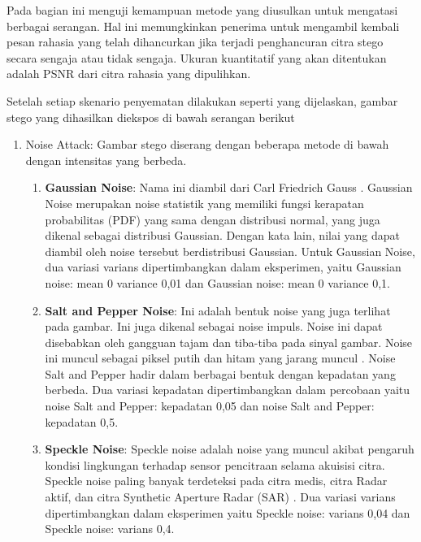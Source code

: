 \documentclass{ittelkom}
\begin{document}
Pada bagian ini menguji kemampuan metode yang diusulkan untuk mengatasi
berbagai serangan. Hal ini memungkinkan penerima untuk mengambil kembali pesan
rahasia yang telah dihancurkan jika terjadi penghancuran citra stego secara
sengaja atau tidak sengaja. Ukuran kuantitatif yang akan ditentukan adalah PSNR
dari citra rahasia yang dipulihkan.

Setelah setiap skenario penyematan dilakukan seperti yang dijelaskan, gambar
stego yang dihasilkan diekspos di bawah serangan berikut


\begin{enumerate}
    \item Noise Attack: Gambar stego diserang dengan beberapa metode di bawah dengan
          intensitas yang berbeda.
          \begin{enumerate}
              \item \textbf{Gaussian Noise}: Nama ini diambil dari Carl Friedrich Gauss
                    \cite{selamistudy}. Gaussian Noise merupakan noise statistik yang memiliki
                    fungsi kerapatan probabilitas (PDF) yang sama dengan distribusi normal, yang
                    juga dikenal sebagai distribusi Gaussian. Dengan kata lain, nilai yang dapat
                    diambil oleh noise tersebut berdistribusi Gaussian. Untuk Gaussian Noise, dua
                    variasi varians dipertimbangkan dalam eksperimen, yaitu Gaussian noise: mean 0
                    variance 0,01 dan Gaussian noise: mean 0 variance 0,1.
              \item \textbf{Salt and Pepper Noise}: Ini adalah bentuk noise yang juga terlihat pada
                    gambar. Ini juga dikenal sebagai noise impuls. Noise ini dapat disebabkan oleh
                    gangguan tajam dan tiba-tiba pada sinyal gambar. Noise ini muncul sebagai
                    piksel putih dan hitam yang jarang muncul \cite{kaisar2008salt}. Noise Salt and Pepper hadir
                    dalam berbagai bentuk dengan kepadatan yang berbeda. Dua variasi kepadatan
                    dipertimbangkan dalam percobaan yaitu noise Salt and Pepper: kepadatan 0,05 dan
                    noise Salt and Pepper: kepadatan 0,5.
              \item \textbf{Speckle Noise}: Speckle noise adalah noise yang muncul akibat pengaruh kondisi
                    lingkungan terhadap sensor pencitraan selama akuisisi citra. Speckle noise
                    paling banyak terdeteksi pada citra medis, citra Radar aktif, dan citra
                    Synthetic Aperture Radar (SAR) \cite{mansourpour2006effects}. Dua variasi varians dipertimbangkan dalam
                    eksperimen yaitu Speckle noise: varians 0,04 dan Speckle noise: varians 0,4.
          \end{enumerate}


\end{enumerate}
\end{document}
